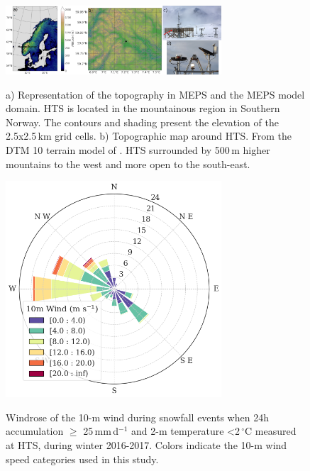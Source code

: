 \documentclass{ametsocV5}
\begin{document}
\begin{figure}[t]
    \noindent\includegraphics[width=19pc,angle=0]{fig1.jpg}\\
    \caption{a) Representation of the topography in MEPS and the MEPS model domain. HTS is located in the mountainous region in Southern Norway. The contours and shading present the elevation of the 2.5x2.5\,km grid cells. b) Topographic map around HTS. From the DTM 10 terrain model of \protect\citet{geonorge_dtm_2018}. HTS surrounded by 500\,m higher mountains to the west and more open to the south-east.
}
    \label{fig:norway_map}
\end{figure}

\begin{figure}[t]
    \noindent\includegraphics[width=19pc,angle=0]{fig2.png}\\
    \caption{Windrose of the 10-m wind during snowfall events when 24h accumulation $\geq$ 25\,mm\,d$^{-1}$ and 2-m temperature \textless 2\,$^{\circ}$C measured at HTS, during winter 2016-2017. Colors indicate the 10-m wind speed categories used in this study. 
}
    \label{fig:windrose}
\end{figure}
\end{document}

